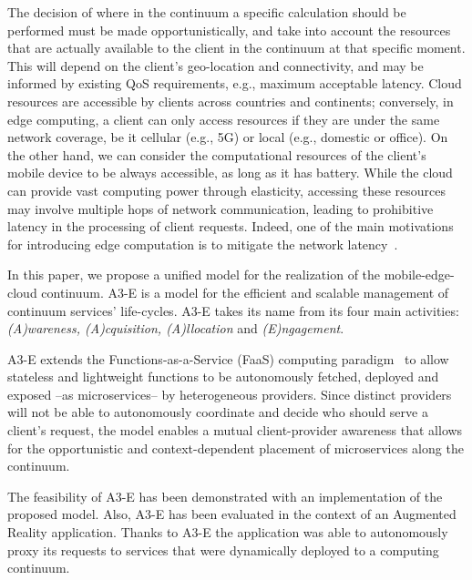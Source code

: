 The decision of where in the continuum a specific calculation should be performed must be made opportunistically, and take into account the resources that are actually available to the client in the continuum at that specific moment. This will depend on the client's geo-location and connectivity, and may be informed by existing QoS requirements, e.g., maximum acceptable latency. Cloud resources are accessible by clients across countries and continents; conversely, in edge computing, a client can only access resources if they are under the same network coverage, be it cellular (e.g., 5G) or local (e.g., domestic or office). On the other hand, we can consider the computational resources of the client's mobile device to be always accessible, as long as it has battery. While the cloud can provide vast computing power through elasticity, accessing these resources may involve multiple hops of network communication, leading to prohibitive latency in the processing of client requests. Indeed, one of the main motivations for introducing edge computation is to mitigate the network latency~\cite{Shi:2016}.

In this paper, we propose a unified model for the realization of the mobile-edge-cloud continuum. A3-E is a model for the efficient and scalable management of continuum services' life-cycles. A3-E takes its name from its four main activities: \textit{(A)wareness, (A)cquisition, (A)llocation} and \textit{(E)ngagement}. 


A3-E extends the Functions-as-a-Service (FaaS) computing paradigm~\cite{Hendrickson:2016,baldini2017serverless,GarrigaMendonca2017} to allow stateless and lightweight functions to be autonomously fetched, deployed and exposed --as microservices-- by heterogeneous providers. Since distinct providers will not be able to autonomously coordinate and decide who should serve a client's request, the model enables a mutual client-provider awareness that allows for the opportunistic and context-dependent placement of microservices along the continuum. 


The feasibility of A3-E has been demonstrated with an implementation of the proposed model. Also, A3-E has been evaluated in the context of an Augmented Reality application. Thanks to A3-E the application was able to autonomously proxy its requests to services that were dynamically deployed to a computing continuum. 

